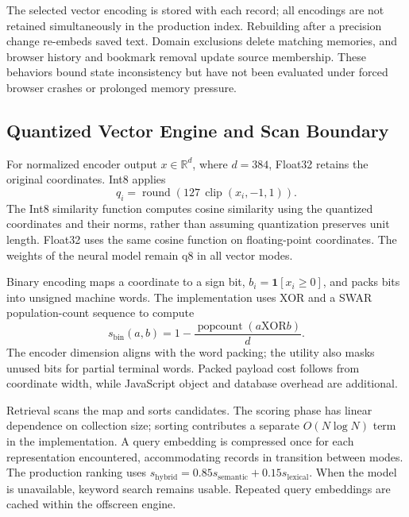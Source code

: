 \documentclass[conference]{IEEEtran}
\newcommand{\mDimensions}{384}
\begin{document}
The selected vector encoding is stored with each record; all encodings are not
retained simultaneously in the production index. Rebuilding after a precision
change re-embeds saved text. Domain exclusions delete matching memories, and
browser history and bookmark removal update source membership. These behaviors
bound state inconsistency but have not been evaluated under forced browser
crashes or prolonged memory pressure.

\subsection{Quantized Vector Engine and Scan Boundary}
For normalized encoder output $x\in\mathbb{R}^{d}$, where
$d=\mDimensions$, Float32 retains the original coordinates. Int8 applies
\begin{equation}
 q_i=\operatorname{round}\!\left(127\,
       \operatorname{clip}(x_i,-1,1)\right).
 \label{eq:int8}
\end{equation}
The Int8 similarity function computes cosine similarity using the quantized
coordinates and their norms, rather than assuming quantization preserves
unit length. Float32 uses the same cosine function on floating-point
coordinates. The weights of the neural model remain q8 in all vector modes.

Binary encoding maps a coordinate to a sign bit,
$b_i=\mathbf{1}[x_i\geq0]$, and packs bits into unsigned machine words.
The implementation uses XOR and a SWAR population-count sequence to compute
\begin{equation}
 s_{\mathrm{bin}}(a,b)=1-
 \frac{\operatorname{popcount}(a\mathbin{\mathrm{XOR}}b)}{d}.
 \label{eq:binary}
\end{equation}
The encoder dimension aligns with the word packing; the utility also masks
unused bits for partial terminal words. Packed payload cost follows from
coordinate width, while JavaScript object and database overhead are additional.

Retrieval scans the map and sorts candidates. The scoring phase has linear
dependence on collection size; sorting contributes a separate
$O(N\log N)$ term in the implementation. A query embedding is compressed once
for each representation encountered, accommodating records in transition
between modes. The production ranking uses
$s_{\mathrm{hybrid}}=0.85s_{\mathrm{semantic}}+0.15s_{\mathrm{lexical}}$.
When the model is unavailable, keyword search remains usable. Repeated query
embeddings are cached within the offscreen engine.
\end{document}
